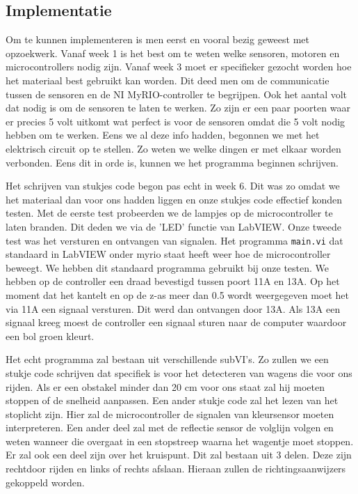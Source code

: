 \documentclass[a4paper,twoside,kulak]{kulakreport} %
\begin{document}
\subsection{Implementatie}


Om te kunnen implementeren is men eerst en vooral bezig geweest met opzoekwerk. Vanaf week 1 is het best om te weten welke sensoren, motoren en microcontrollers nodig zijn. Vanaf week 3 moet er specifieker gezocht worden hoe het materiaal best gebruikt kan worden. 
Dit deed men om de communicatie tussen de sensoren en de NI MyRIO-controller te begrijpen. Ook het aantal volt dat nodig is om de sensoren te laten te werken. Zo zijn er een paar poorten waar er precies 5 volt uitkomt wat perfect is voor de sensoren omdat die 5 volt nodig hebben om te werken. Eens we al deze info hadden, begonnen we met het elektrisch circuit op te stellen. Zo weten we welke dingen er met elkaar worden verbonden. Eens dit in orde is, kunnen we het programma beginnen schrijven.

Het schrijven van stukjes code begon pas echt in week 6. Dit was zo omdat we het materiaal dan voor ons hadden liggen en onze stukjes code effectief konden testen. Met de eerste test probeerden we de lampjes op de microcontroller te laten branden. Dit deden we via de 'LED' functie van LabVIEW. Onze tweede test was het versturen en ontvangen van signalen. Het programma \texttt{main.vi} dat standaard in LabVIEW onder myrio staat heeft weer hoe de microcontroller beweegt. We hebben dit standaard programma gebruikt bij onze testen. We hebben op de controller een draad bevestigd tussen poort 11A en 13A. Op het moment dat het kantelt en op de z-as meer dan 0.5 wordt weergegeven moet het via 11A een signaal versturen. Dit werd dan ontvangen door 13A. Als 13A een signaal kreeg moest de controller een signaal sturen naar de computer waardoor een bol groen kleurt. 

Het echt programma zal bestaan uit verschillende subVI's. Zo zullen we een stukje code schrijven dat specifiek is voor het detecteren van wagens die voor ons rijden. Als er een obstakel minder dan 20 cm voor ons staat zal hij moeten stoppen of de snelheid aanpassen. Een ander stukje code zal het lezen van het stoplicht zijn. Hier zal de microcontroller de signalen van kleursensor moeten interpreteren. Een ander deel zal met de reflectie sensor de volglijn volgen en weten wanneer die overgaat in een stopstreep waarna het wagentje moet stoppen.
Er zal ook een deel zijn over het kruispunt. Dit zal bestaan uit 3 delen. Deze zijn rechtdoor rijden en links of rechts afslaan. Hieraan zullen de richtingsaanwijzers gekoppeld worden. 
\end{document}

